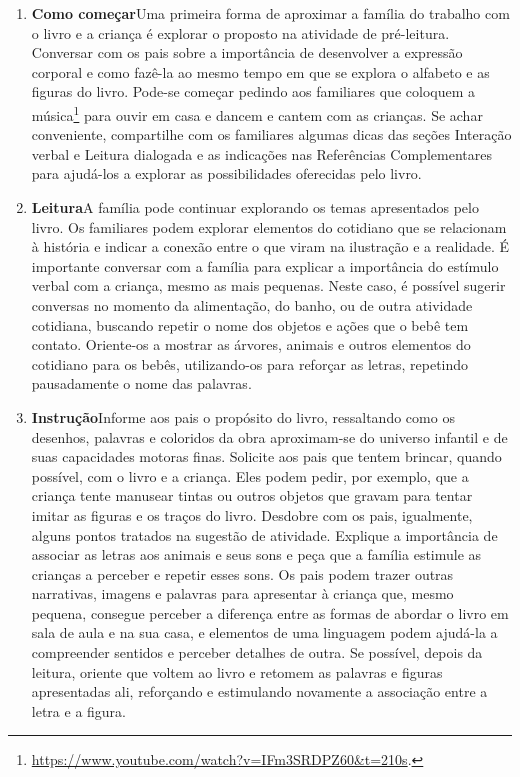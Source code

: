 \documentclass[11pt]{extarticle}
\begin{document}
\begin{enumerate}
\item \textbf{Como começar}\quad Uma primeira forma de aproximar a família do trabalho com o livro e a criança é explorar o proposto na atividade de pré-leitura. Conversar com os pais sobre a importância de desenvolver a expressão corporal e como fazê-la ao mesmo tempo em que se explora o alfabeto e as figuras do livro. Pode-se começar pedindo aos familiares que coloquem a música\footnote{\url{https://www.youtube.com/watch?v=IFm3SRDPZ60&t=210s}.} para ouvir em casa e dancem e cantem com as crianças.
Se achar conveniente, compartilhe com 
os familiares algumas dicas das seções Interação verbal 
e Leitura dialogada e as indicações nas Referências Complementares 
para ajudá-los a explorar as possibilidades oferecidas pelo livro. 

\item \textbf{Leitura}\quad A família pode continuar 
explorando os temas apresentados pelo livro. Os familiares podem explorar 
elementos do cotidiano que se relacionam à história e indicar a conexão 
entre o que viram na ilustração e a realidade.
É importante conversar com a família para explicar a importância do estímulo verbal com a criança, mesmo as mais pequenas. Neste caso, é possível sugerir conversas no momento da alimentação, do banho, ou de outra atividade cotidiana, buscando repetir o nome dos objetos e ações que o bebê tem contato. 
Oriente-os a mostrar as 
árvores, animais e outros elementos do cotidiano para os bebês, utilizando-os para reforçar as letras, repetindo pausadamente o nome das palavras.

\item \textbf{Instrução}\quad Informe aos pais o propósito do livro, ressaltando como os desenhos, palavras e coloridos da obra aproximam-se do universo infantil e de suas capacidades motoras finas. Solicite aos pais que tentem brincar, quando possível, com o livro e a criança. Eles podem pedir, por exemplo, que a criança tente manusear tintas ou outros objetos que gravam para tentar imitar as figuras e os traços do livro.
Desdobre com os pais, igualmente, alguns pontos tratados na sugestão de atividade.
Explique a importância de associar as letras aos animais e seus sons e peça que a família estimule as crianças a perceber e repetir esses sons.
Os pais podem trazer outras narrativas, imagens e palavras para apresentar à criança que, mesmo pequena, consegue perceber a diferença entre 
as formas de abordar o livro em sala de aula e na sua casa, e elementos de uma linguagem podem ajudá-la a compreender sentidos e perceber detalhes de outra. Se possível, depois da leitura, oriente que voltem ao livro e retomem as palavras e figuras apresentadas ali, reforçando e estimulando novamente a associação entre a letra e a figura.


\end{enumerate}
\end{document}

